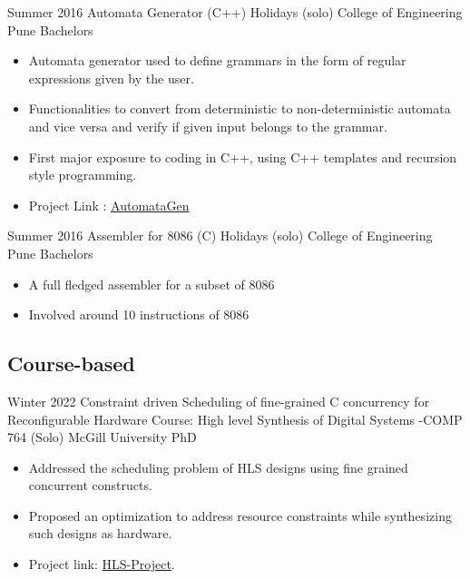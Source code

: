 \documentclass[11pt,a4paper,sans]{moderncv} %
\begin{document}
        \cventry
            {Summer 2016} %
            {Automata Generator (C++)} %
            {Holidays (solo)} %
            {College of Engineering Pune} %
            {Bachelors} 
            {
                \begin{itemize} %
                    \item Automata generator used to define grammars in the form of regular expressions given by the user.
                    \item Functionalities to convert from deterministic to non-deterministic automata and vice versa and verify if given input belongs to the grammar.
                    \item First major exposure to coding in C++, using C++ templates and recursion style programming.
                    \item Project Link : \href{https://github.com/jaag5678/TCS_App.git}{AutomataGen}
                \end{itemize}
            }
            {}

        \cventry
            {Summer 2016} %
            {Assembler for 8086 (C)} %
            {Holidays (solo)} %
            {College of Engineering Pune} %
            {Bachelors} 
            {
                \begin{itemize} %
                    \item A full fledged assembler for a subset of 8086 
                    \item Involved around 10 instructions of 8086
                \end{itemize}
            }
            {}

    \subsection{Course-based}

        \cventry
            {Winter 2022} %
            {Constraint driven Scheduling of fine-grained C concurrency for Reconfigurable Hardware} %
            {Course: High level Synthesis of Digital Systems -COMP 764 (Solo)} %
            {McGill University} %
            {PhD} 
            {
                \begin{itemize} %
                  \item Addressed the scheduling problem of HLS designs using fine grained concurrent constructs.
                  \item Proposed an optimization to address resource constraints while synthesizing such designs as hardware.
                  \item Project link: \href{https://github.com/jaag5678/COMP-764---HLS/tree/master/Project}{HLS-Project}.
                \end{itemize}
            }
            {}
\end{document}
